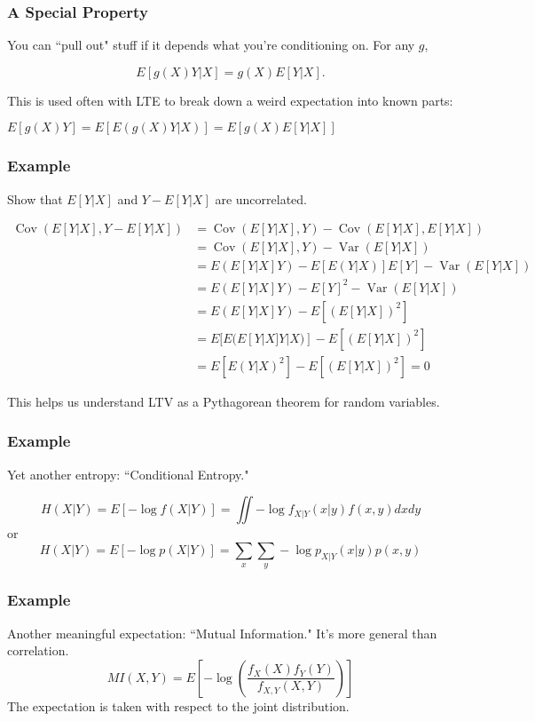 \documentclass{beamer}
\begin{document}

\begin{frame}
\frametitle{A Special Property}

You can ``pull out" stuff if it depends what you're conditioning on. For any $g$,

\[
E[g(X)Y|X] = g(X)E[Y|X].
\]

This is used often with LTE to break down a weird expectation into known parts:

$E[g(X)Y] = E[E(g(X)Y|X)] = E[g(X) E[Y|X]]$

\end{frame}

\begin{frame}
\frametitle{Example}

Show that $E[Y|X]$ and $Y-E[Y|X]$ are uncorrelated.
\pause

\begin{align*}
\operatorname{Cov}(E[Y|X], Y-E[Y|X]) &= \operatorname{Cov}(E[Y|X], Y) - \operatorname{Cov}(E[Y|X],E[Y|X]) \\
&= \operatorname{Cov}(E[Y|X], Y) - \operatorname{Var}(E[Y|X]) \\
&= E(E[Y|X] Y) - E[E(Y|X)]E[Y] - \operatorname{Var}(E[Y|X]) \\
&= E(E[Y|X] Y) - E[Y]^2 - \operatorname{Var}(E[Y|X]) \\
&= E(E[Y|X] Y) - E[(E[Y|X])^2] \\
&= E[E(E[Y|X] Y |X)] - E[(E[Y|X])^2] \\
&= E[E( Y |X)^2] - E[(E[Y|X])^2] = 0
\end{align*}

This helps us understand LTV as a Pythagorean theorem for random variables.
\end{frame}


\begin{frame}
\frametitle{Example}

Yet another entropy: ``Conditional Entropy." 

\[
H(X|Y) = E[-\log f(X|Y)] =  \iint -\log f_{X|Y}(x|y) f(x,y) dx dy
\]
or
\[
H(X|Y) = E[-\log p(X|Y)] =  \sum_x \sum_y -\log p_{X|Y}(x|y) p(x,y) 
\]

\end{frame}
\begin{frame}
\frametitle{Example}

Another meaningful expectation: ``Mutual Information." It's more general than correlation.
\[
MI(X,Y) = E\left[-\log \left(\frac{f_X(X)f_Y(Y)}{f_{X,Y}(X,Y) }\right) \right]
\]
The expectation is taken with respect to the joint distribution.
\end{frame}
\end{document}
